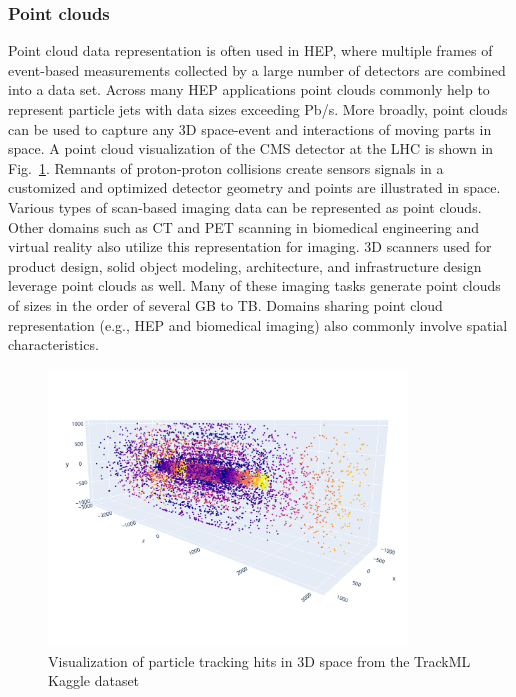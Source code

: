 \subsubsection{Point clouds}
 Point cloud data representation is often used in HEP, where multiple frames of event-based measurements collected by a large number of detectors are combined into a data set. Across many HEP applications point clouds commonly help to represent particle jets with data sizes exceeding Pb/s. 
 More broadly, point clouds can be used to capture any 3D space-event and interactions of moving parts in space. 
 A point cloud visualization of the CMS detector at the LHC is shown in Fig.~\ref{fig:repcloud}.  Remnants of proton-proton collisions create sensors signals in a customized and optimized detector geometry and points are illustrated in space. Various types of scan-based imaging data can be represented as point clouds. 
 Other domains such as CT and PET scanning in biomedical engineering and virtual reality also utilize this representation for imaging. 3D scanners used for product design, solid object modeling, architecture, and infrastructure design leverage point clouds as well. Many of these imaging tasks generate point clouds of sizes in the order of several GB to TB. Domains sharing point cloud representation (e.g., HEP and biomedical imaging) also commonly involve spatial characteristics. 
 \begin{figure}[tbh!]
     \centering
     \includegraphics[width=0.85\textwidth]{figures/kaggle-tracking.pdf}
     \caption{Visualization of particle tracking hits in 3D space from the TrackML Kaggle dataset~\cite{cmseventdisplay}}
     \label{fig:repcloud}
 \end{figure}
 
